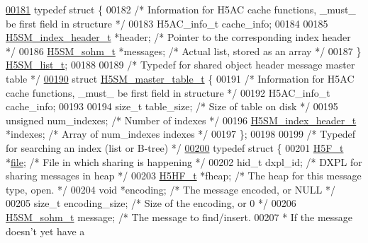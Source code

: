 \begin{DoxyCode}
\hyperlink{struct_h5_s_m__list__t}{00181} \textcolor{keyword}{typedef} \textcolor{keyword}{struct }\{
00182     \textcolor{comment}{/* Information for H5AC cache functions, \_must\_ be first field in structure */}
00183     H5AC\_info\_t cache\_info;
00184 
00185     \hyperlink{struct_h5_s_m__index__header__t}{H5SM\_index\_header\_t} *header;    \textcolor{comment}{/* Pointer to the corresponding index header */}
00186     \hyperlink{struct_h5_s_m__sohm__t}{H5SM\_sohm\_t} *messages;          \textcolor{comment}{/* Actual list, stored as an array */}
00187 \} \hyperlink{struct_h5_s_m__list__t}{H5SM\_list\_t};
00188 
00189 \textcolor{comment}{/* Typedef for shared object header message master table */}
\hyperlink{struct_h5_s_m__master__table__t}{00190} \textcolor{keyword}{struct }\hyperlink{struct_h5_s_m__master__table__t}{H5SM\_master\_table\_t} \{
00191     \textcolor{comment}{/* Information for H5AC cache functions, \_must\_ be first field in structure */}
00192     H5AC\_info\_t cache\_info;
00193 
00194     \textcolor{keywordtype}{size\_t} table\_size;              \textcolor{comment}{/* Size of table on disk */}
00195     \textcolor{keywordtype}{unsigned} num\_indexes;           \textcolor{comment}{/* Number of indexes */}
00196     \hyperlink{struct_h5_s_m__index__header__t}{H5SM\_index\_header\_t} *indexes;   \textcolor{comment}{/* Array of num\_indexes indexes */}
00197 \};
00198 
00199 \textcolor{comment}{/* Typedef for searching an index (list or B-tree) */}
\hyperlink{struct_h5_s_m__mesg__key__t}{00200} \textcolor{keyword}{typedef} \textcolor{keyword}{struct }\{
00201     \hyperlink{struct_h5_f__t}{H5F\_t} *\hyperlink{structfile}{file};                        \textcolor{comment}{/* File in which sharing is happening */}
00202     hid\_t dxpl\_id;                      \textcolor{comment}{/* DXPL for sharing messages in heap */}
00203     \hyperlink{struct_h5_h_f__t}{H5HF\_t} *fheap;                \textcolor{comment}{/* The heap for this message type, open. */}
00204     \textcolor{keywordtype}{void} *encoding;                 \textcolor{comment}{/* The message encoded, or NULL */}
00205     \textcolor{keywordtype}{size\_t} encoding\_size;       \textcolor{comment}{/* Size of the encoding, or 0 */}
00206     \hyperlink{struct_h5_s_m__sohm__t}{H5SM\_sohm\_t} message;                \textcolor{comment}{/* The message to find/insert.}
00207 \textcolor{comment}{                                         * If the message doesn't yet have a}

\end{DoxyCode}
